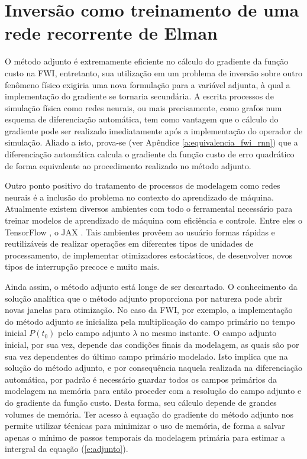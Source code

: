   \section{Inversão como treinamento de uma rede recorrente de Elman}

    O método adjunto é extremamente eficiente no cálculo do gradiente da função custo na FWI, entretanto, sua utilização em um problema de inversão sobre outro fenômeno físico exigiria uma nova formulação para a variável adjunta, à qual a implementação do gradiente se tornaria secundária. A escrita processos de simulação física como redes neurais, ou mais precisamente, como grafos num esquema de diferenciação automática, tem como vantagem que o cálculo do gradiente pode ser realizado imediatamente após a implementação do operador de simulação. Aliado a isto, prova-se (ver Apêndice \ref{a:equivalencia_fwi_rnn}) que a diferenciação automática calcula o gradiente da função custo de erro quadrático de forma equivalente ao procedimento realizado no método adjunto.

    Outro ponto positivo do tratamento de processos de modelagem como redes neurais é a inclusão do problema no contexto do aprendizado de máquina. Atualmente existem diversos ambientes com todo o ferramental necessário para treinar modelos de aprendizado de máquina com eficiência e controle. Entre eles o TensorFlow , o JAX . Tais ambientes provêem ao usuário formas rápidas e reutilizáveis de realizar operações em diferentes tipos de unidades de processamento, de implementar otimizadores estocásticos, de desenvolver novos tipos de interrupção precoce e muito mais.

    Ainda assim, o método adjunto está longe de ser descartado. O conhecimento da solução analítica que o método adjunto proporciona por natureza pode abrir novas janelas para otimização. No caso da FWI, por exemplo, a implementação do método adjunto se inicializa pela multiplicação do campo primário no tempo inicial $P(t_0)$ pelo campo adjunto $\lambda$ no mesmo instante. O campo adjunto inicial, por sua vez, depende das condições finais da modelagem, as quais são por sua vez dependentes do último campo primário modelado. Isto implica que na solução do método adjunto, e por consequência naquela realizada na diferenciação automática, por padrão é necessário guardar todos os campos primários da modelagem na memória para então proceder com a resolução do campo adjunto e do gradiente da função custo. Desta forma, seu cálculo depende de grandes volumes de memória. Ter acesso à equação do gradiente do método adjunto nos permite utilizar técnicas para minimizar o uso de memória, de forma a salvar apenas o mínimo de passos temporais da modelagem primária para estimar a intergral da equação (\ref{e:adjunto}).



